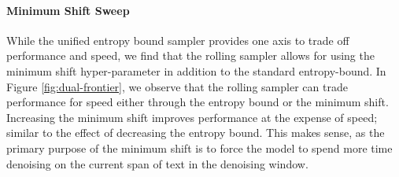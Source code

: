 \paragraph{Minimum Shift Sweep}
While the unified entropy bound sampler provides one axis to trade off performance and speed, we find that the rolling sampler allows for using the minimum shift hyper-parameter in addition to the standard entropy-bound. 
In Figure \ref{fig:dual-frontier}, we observe that the rolling sampler can trade performance for speed either through the entropy bound or the minimum shift. 
Increasing the minimum shift improves performance at the expense of speed; similar to the effect of decreasing the entropy bound.
This makes sense, as the primary purpose of the minimum shift is to force the model to spend more time denoising on the current span of text in the denoising window.
